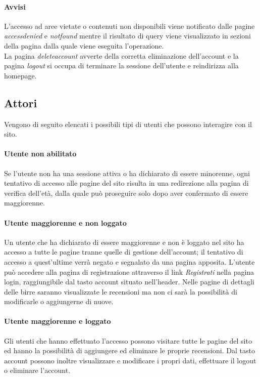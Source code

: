 \paragraph{Avvisi}
L'accesso ad aree vietate o contenuti non disponibili viene notificato dalle pagine \textit{accessdenied} e \textit{notfound} mentre il risultato di query viene visualizzato in sezioni della pagina dalla quale viene eseguita l'operazione.\\
La pagina \textit{deleteaccount} avverte della corretta eliminazione dell'account e la pagina \textit{logout} si occupa di terminare la sessione dell'utente e reindirizza alla homepage.

\subsection{Attori}
Vengono di seguito elencati i possibili tipi di utenti che possono interagire con il sito.

\paragraph{Utente non abilitato}
Se l'utente non ha una sessione attiva o ha dichiarato di essere minorenne, ogni tentativo di accesso alle pagine del sito risulta in una redirezione alla pagina di verifica dell'età, dalla quale può proseguire solo dopo aver confermato di essere maggiorenne.

\paragraph{Utente maggiorenne e non loggato}
Un utente che ha dichiarato di essere maggiorenne e non è loggato nel sito ha accesso a tutte le pagine tranne quelle di gestione dell'account; il tentativo di accesso a quest'ultime verrà negato e segnalato da una pagina apposita.
L'utente può accedere alla pagina di registrazione attraverso il link \textit{Registrati} nella pagina login, raggiungibile dal tasto account situato nell'header.
Nelle pagine di dettagli delle birre saranno visualizzate le recensioni ma non ci sarà la possibilità di modificarle o aggiungerne di nuove.


\paragraph{Utente maggiorenne e loggato}
Gli utenti che hanno effettuato l'accesso possono visitare tutte le pagine del sito ed hanno la possibilità di aggiungere ed eliminare le proprie recensioni.
Dal tasto account possono inoltre visualizzare e modificare i propri dati, effettuare il logout o eliminare l'account.


